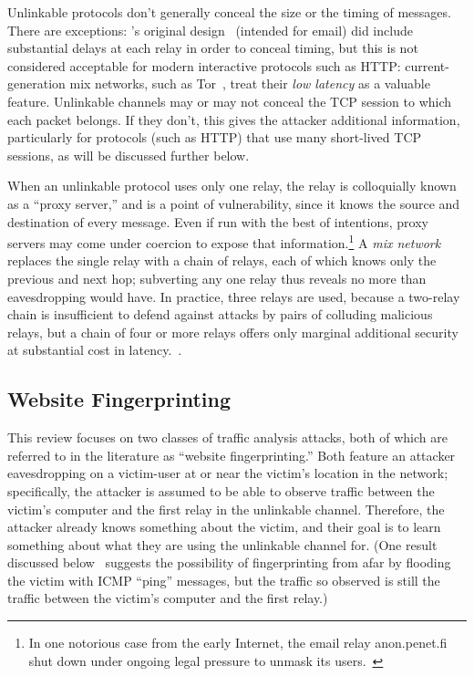 Unlinkable protocols don't generally conceal the size or the timing of
messages.  There are exceptions: \citeauthor{chaum1981mix}'s original
design~\cite{chaum1981mix} (intended for email) did include
substantial delays at each relay in order to conceal timing, but this
is not considered acceptable for modern interactive protocols such as
HTTP: current-generation mix networks, such as
Tor~\cite{dingledine2004tor}, treat their \emph{low latency} as a
valuable feature.  Unlinkable channels may or may not conceal the TCP
session to which each packet belongs.  If they don't, this gives the
attacker additional information, particularly for protocols (such as
HTTP) that use many short-lived TCP sessions, as will be discussed
further below.

When an unlinkable protocol uses only one relay, the relay is
colloquially known as a “proxy server,” and is a point of
vulnerability, since it knows the source and destination of every
message.  Even if run with the best of intentions, proxy servers may
come under coercion to expose that information.\footnote{In one
  notorious case from the early Internet, the email relay
  \textsf{anon.penet.fi} shut down under ongoing legal pressure to
  unmask its users.~\cite{newman1996church}} A \emph{mix
  network}~\cite{chaum1981mix} replaces the single relay with a chain
of relays, each of which knows only the previous and next hop;
subverting any one relay thus reveals no more than eavesdropping would
have.  In practice, three relays are used, because a two-relay chain
is insufficient to defend against attacks by pairs of colluding
malicious relays, but a chain of four or more relays offers only
marginal additional security at substantial cost in
latency.~\cite{wright2002analysis,wright2003defending}.

\subsection{Website Fingerprinting}

This review focuses on two classes of traffic analysis attacks, both
of which are referred to in the literature as “website
fingerprinting.”  Both feature an attacker eavesdropping on a
victim-user at or near the victim's location in the network;
specifically, the attacker is assumed to be able to observe traffic
between the victim's computer and the first relay in the unlinkable
channel.  Therefore, the attacker already knows something about the
victim, and their goal is to learn something about what they are using
the unlinkable channel for.  (One result discussed
below~\cite{gong2011remote} suggests the possibility of fingerprinting
from afar by flooding the victim with ICMP “ping” messages, but the
traffic so observed is still the traffic between the victim's computer
and the first relay.)

